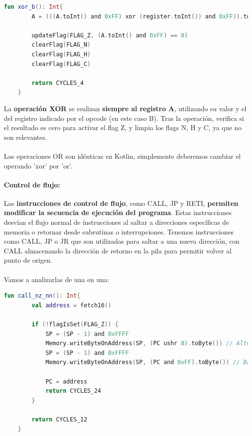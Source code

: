\begin{lstlisting}[language=Kotlin, caption={Operación XOR}, label={code:kotlinxor}]
    fun xor_b(): Int{
        A = (((A.toInt() and 0xFF) xor (register.toInt()) and 0xFF)).toByte()

        updateFlag(FLAG_Z, (A.toInt() and 0xFF) == 0)
        clearFlag(FLAG_N)
        clearFlag(FLAG_H)
        clearFlag(FLAG_C)
        
        return CYCLES_4
    }
\end{lstlisting}

La \textbf{operación XOR} se realizan \textbf{siempre al registro A}, utilizando su valor y el del registro indicado por el opcode (en este caso B). Tras la operación, verifica si el resultado es cero para activar el flag Z, y limpia los flags N, H y C, ya que no son relevantes.
\\\\
Las operaciones OR son idénticas en Kotlin, simplemente deberemos cambiar el operando 'xor' por 'or'.

\paragraph{Control de flujo:} Las \textbf{instrucciones de control de flujo}, como CALL, JP y RETI, \textbf{permiten modificar la secuencia de ejecución del programa}. Estas instrucciones desvían el flujo normal de instrucciones al saltar a direcciones específicas de memoria o retornar desde subrutinas o interrupciones. Tenemos instrucciones como CALL, JP o JR que son utilizadas para saltar a una nueva dirección, con CALL almacenando la dirección de retorno en la pila para permitir volver al punto de origen.
\\\\
Vamos a analizarlas de una en una:
\begin{lstlisting}[language=Kotlin, caption={Operación CALL}, label={code:kotlincall}]
    fun call_nz_nn(): Int{
        val address = fetch16()

        if (!flagIsSet(FLAG_Z)) {
            SP = (SP - 1) and 0xFFFF
            Memory.writeByteOnAddress(SP, (PC ushr 8).toByte()) // Alto
            SP = (SP - 1) and 0xFFFF
            Memory.writeByteOnAddress(SP, (PC and 0xFF).toByte()) // Bajo
    
            PC = address
            return CYCLES_24
        }

        return CYCLES_12
    }
\end{lstlisting}

